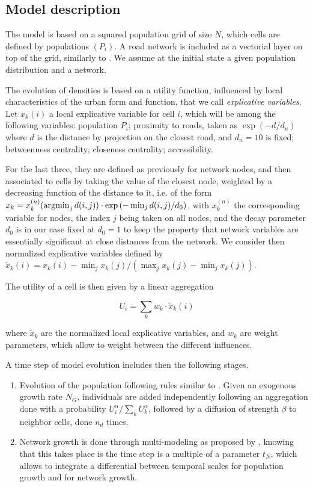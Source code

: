 \subsection{Model description}


The model is based on a squared population grid of size $N$, which cells are defined by populations $(P_i)$. A road network is included as a vectorial layer on top of the grid, similarly to \cite{raimbault2014hybrid}. We assume at the initial state a given population distribution and a network.

The evolution of densities is based on a utility function, influenced by local characteristics of the urban form and function, that we call \emph{explicative variables}. Let $x_k(i)$ a local explicative variable for cell $i$, which will be among the following variables: population $P_i$; proximity to roads, taken as $\exp (-d / d_n)$ where $d$ is the distance by projection on the closest road, and $d_n=10$ is fixed; betweenness centrality; closeness centrality; accessibility.

For the last three, they are defined as previously for network nodes, and then associated to cells by taking the value of the closest node, weighted by a decreasing function of the distance to it, i.e. of the form $x_k = x^{(n)}_k (\operatorname*{\arg\!\min}_j d(i,j)) \cdot \exp \left( -  \min_j d(i,j) / d_0 \right)$, with $x^{(n)}_k$ the corresponding variable for nodes, the index $j$ being taken on all nodes, and the decay parameter $d_0$ is in our case fixed at $d_0=1$ to keep the property that network variables are essentially significant at close distances from the network. We consider then normalized explicative variables defined by $\tilde{x}_k(i) = x_k(i) - \min_j x_k(j) / (\max_j x_k(j) - \min_j x_k(j))$.

The utility of a cell is then given by a linear aggregation

\begin{equation}
U_i = \sum_k w_k \cdot \tilde{x}_k(i)
\end{equation}

where $\tilde{x}_k$ are the normalized local explicative variables, and $w_k$ are weight parameters, which allow to weight between the different influences.


A time step of model evolution includes then the following stages.
\begin{enumerate}
	\item Evolution of the population following rules similar to \cite{2017arXiv170806743R}. Given an exogenous growth rate $N_G$, individuals are added independently following an aggregation done with a probability $U_i^\alpha/\sum_k U_k^\alpha$, followed by a diffusion of strength $\beta$ to neighbor cells, done $n_d$ times.
	\item Network growth is done through multi-modeling as proposed by \cite{raimbault2017modeling}, knowing that this takes place is the time step is a multiple of a parameter $t_N$, which allows to integrate a differential between temporal scales for population growth and for network growth.
\end{enumerate}

